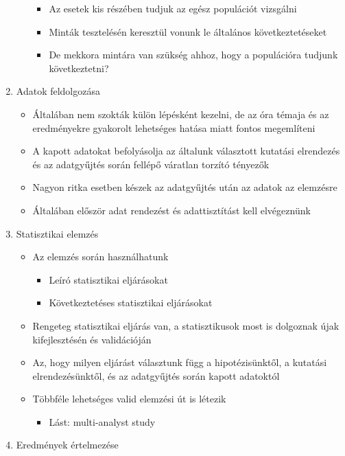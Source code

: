 \documentclass[
  letterpaper,
  DIV=11,
  numbers=noendperiod]{scrreprt}
\providecommand{\tightlist}{%
  \setlength{\itemsep}{0pt}\setlength{\parskip}{0pt}}\usepackage{longtable,booktabs,array}
\begin{document}
\begin{enumerate}
\begin{itemize}
    \begin{itemize}
    \item
      Az esetek kis részében tudjuk az egész populációt vizsgálni
    \item
      Minták tesztelésén keresztül vonunk le általános következtetéseket
    \item
      De mekkora mintára van szükség ahhoz, hogy a populációra tudjunk
      következtetni?
    \end{itemize}
  \end{itemize}
\item
  Adatok feldolgozása

  \begin{itemize}
  \item
    Általában nem szokták külön lépésként kezelni, de az óra témaja és
    az eredményekre gyakorolt lehetséges hatása miatt fontos megemlíteni
  \item
    A kapott adatokat befolyásolja az általunk választott kutatási
    elrendezés és az adatgyűjtés során fellépő váratlan torzító tényezők
  \item
    Nagyon ritka esetben készek az adatgyűjtés után az adatok az
    elemzésre
  \item
    Általában először adat rendezést és adattisztítást kell elvégeznünk
  \end{itemize}
\item
  Statisztikai elemzés

  \begin{itemize}
  \item
    Az elemzés során használhatunk

    \begin{itemize}
    \item
      Leíró statisztikai eljárásokat
    \item
      Következtetéses statisztikai eljárásokat
    \end{itemize}
  \item
    Rengeteg statisztikai eljárás van, a statisztikusok most is
    dolgoznak újak kifejlesztésén és validációján
  \item
    Az, hogy milyen eljárást választunk függ a hipotézisünktől, a
    kutatási elrendezésünktől, és az adatgyűjtés során kapott adatoktól
  \item
    Többféle lehetséges valid elemzési út is létezik

    \begin{itemize}
    \tightlist
    \item
      Lást: multi-analyst study
    \end{itemize}
  \end{itemize}
\item
  Eredmények értelmezése


\end{enumerate}
\end{document}
